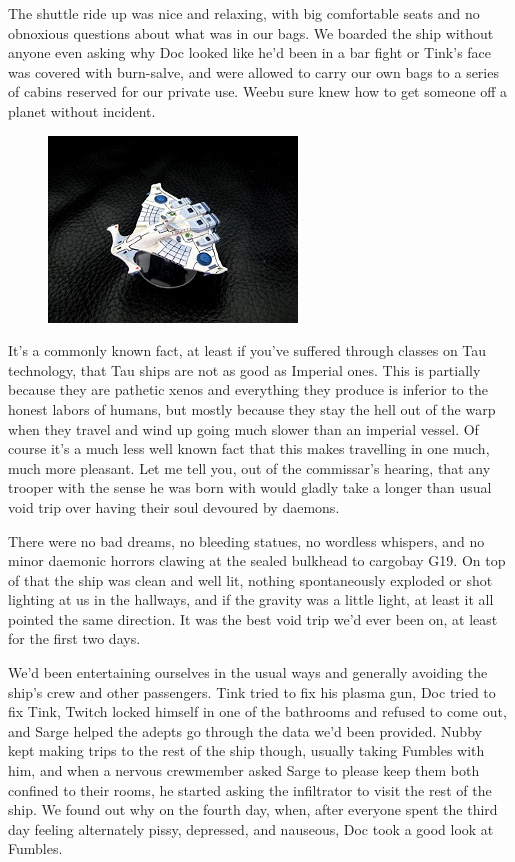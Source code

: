 The shuttle ride up was nice and relaxing, with big comfortable seats and no obnoxious questions about what was in our bags. 
We boarded the ship without anyone even asking why Doc looked like he'd been in a bar fight or Tink's face was covered with burn-salve, and were allowed to carry our own bags to a series of cabins reserved for our private use. 
Weebu sure knew how to get someone off a planet without incident.

\begin{figure}
	\begin{center}
		\includegraphics[width=\figwidth]{pics/10/33.png}
	\end{center}
\end{figure}
It's a commonly known fact, at least if you've suffered through classes on Tau technology, that Tau ships are not as good as Imperial ones. 
This is partially because they are pathetic xenos and everything they produce is inferior to the honest labors of humans, but mostly because they stay the hell out of the warp when they travel and wind up going much slower than an imperial vessel. 
Of course it's a much less well known fact that this makes travelling in one much, much more pleasant. 
Let me tell you, out of the commissar's hearing, that any trooper with the sense he was born with would gladly take a longer than usual void trip over having their soul devoured by daemons.

There were no bad dreams, no bleeding statues, no wordless whispers, and no minor daemonic horrors clawing at the sealed bulkhead to cargobay G19. 
On top of that the ship was clean and well lit, nothing spontaneously exploded or shot lighting at us in the hallways, and if the gravity was a little light, at least it all pointed the same direction. 
It was the best void trip we'd ever been on, at least for the first two days.

We'd been entertaining ourselves in the usual ways and generally avoiding the ship's crew and other passengers. 
Tink tried to fix his plasma gun, Doc tried to fix Tink, Twitch locked himself in one of the bathrooms and refused to come out, and Sarge helped the adepts go through the data we'd been provided. 
Nubby kept making trips to the rest of the ship though, usually taking Fumbles with him, and when a nervous crewmember asked Sarge to please keep them both confined to their rooms, he started asking the infiltrator to visit the rest of the ship. 
We found out why on the fourth day, when, after everyone spent the third day feeling alternately pissy, depressed, and nauseous, Doc took a good look at Fumbles. 


